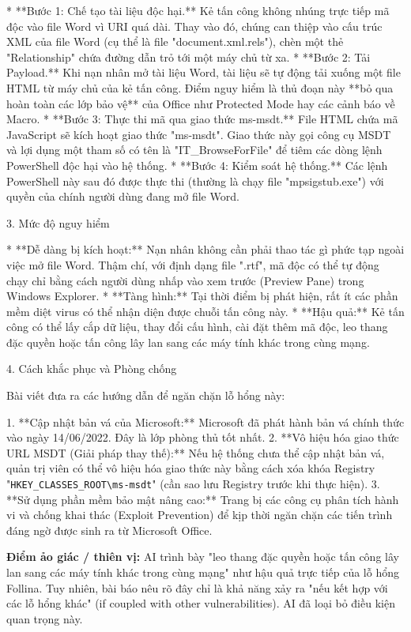 * **Bước 1: Chế tạo tài liệu độc hại.** Kẻ tấn công không nhúng trực tiếp mã độc vào file Word vì URI quá dài. Thay vào đó, chúng can thiệp vào cấu trúc XML của file Word (cụ thể là file "document.xml.rels"), chèn một thẻ "Relationship" chứa đường dẫn trỏ tới một máy chủ từ xa.
* **Bước 2: Tải Payload.** Khi nạn nhân mở tài liệu Word, tài liệu sẽ tự động tải xuống một file HTML từ máy chủ của kẻ tấn công. Điểm nguy hiểm là thủ đoạn này **bỏ qua hoàn toàn các lớp bảo vệ** của Office như Protected Mode hay các cảnh báo về Macro.
* **Bước 3: Thực thi mã qua giao thức ms-msdt.** File HTML chứa mã JavaScript sẽ kích hoạt giao thức "ms-msdt". Giao thức này gọi công cụ MSDT và lợi dụng một tham số có tên là "IT\_BrowseForFile" để tiêm các dòng lệnh PowerShell độc hại vào hệ thống.
* **Bước 4: Kiểm soát hệ thống.** Các lệnh PowerShell này sau đó được thực thi (thường là chạy file "mpsigstub.exe") với quyền của chính người dùng đang mở file Word.

3. Mức độ nguy hiểm

* **Dễ dàng bị kích hoạt:** Nạn nhân không cần phải thao tác gì phức tạp ngoài việc mở file Word. Thậm chí, với định dạng file ".rtf", mã độc có thể tự động chạy chỉ bằng cách người dùng nhấp vào xem trước (Preview Pane) trong Windows Explorer.
* **Tàng hình:** Tại thời điểm bị phát hiện, rất ít các phần mềm diệt virus có thể nhận diện được chuỗi tấn công này.
* **Hậu quả:** Kẻ tấn công có thể lấy cắp dữ liệu, thay đổi cấu hình, cài đặt thêm mã độc, leo thang đặc quyền hoặc tấn công lây lan sang các máy tính khác trong cùng mạng.

4. Cách khắc phục và Phòng chống

Bài viết đưa ra các hướng dẫn để ngăn chặn lỗ hổng này:

1. **Cập nhật bản vá của Microsoft:** Microsoft đã phát hành bản vá chính thức vào ngày 14/06/2022. Đây là lớp phòng thủ tốt nhất.
2. **Vô hiệu hóa giao thức URL MSDT (Giải pháp thay thế):** Nếu hệ thống chưa thể cập nhật bản vá, quản trị viên có thể vô hiệu hóa giao thức này bằng cách xóa khóa Registry "\texttt{HKEY\_CLASSES\_ROOT\textbackslash ms-msdt}" (cần sao lưu Registry trước khi thực hiện).
3. **Sử dụng phần mềm bảo mật nâng cao:** Trang bị các công cụ phân tích hành vi và chống khai thác (Exploit Prevention) để kịp thời ngăn chặn các tiến trình đáng ngờ được sinh ra từ Microsoft Office.

\textbf{Điểm ảo giác / thiên vị:}
AI trình bày "leo thang đặc quyền hoặc tấn công lây lan sang các máy tính khác trong cùng mạng" như hậu quả trực tiếp của lỗ hổng Follina. Tuy nhiên, bài báo nêu rõ đây chỉ là khả năng xảy ra "nếu kết hợp với các lỗ hổng khác" (if coupled with other vulnerabilities). AI đã loại bỏ điều kiện quan trọng này.

